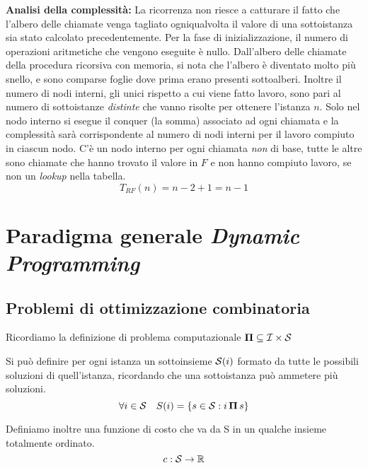 \textbf{Analisi della complessità:}
La ricorrenza non riesce a catturare il fatto che l'albero delle chiamate venga tagliato ogniqualvolta il valore di una sottoistanza sia stato calcolato precedentemente.
Per la fase di inizializzazione, il numero di operazioni aritmetiche che vengono eseguite è nullo.
Dall'albero delle chiamate della procedura ricorsiva con memoria, si nota che l'albero è diventato molto più snello, e sono comparse foglie dove prima erano presenti sottoalberi. Inoltre il numero di nodi interni, gli unici rispetto a cui viene fatto lavoro, sono pari al numero di sottoistanze \emph{distinte} che vanno risolte per ottenere l'istanza $n$. 
Solo nel nodo interno si esegue il conquer (la somma) associato ad ogni chiamata e la complessità sarà corrispondente al numero di nodi interni per il lavoro compiuto in ciascun nodo. C'è un nodo interno per ogni chiamata \emph{non} di base, tutte le altre sono chiamate che hanno trovato il valore in $F$ e non hanno compiuto lavoro, se non un \emph{lookup} nella tabella.
\begin{equation*}
    T_{RF} (n) = n-2+1 = n-1
\end{equation*}

\section{Paradigma generale \emph{Dynamic Programming}}

\subsection{Problemi di ottimizzazione combinatoria}

Ricordiamo la definizione di problema computazionale $\bm{\Pi}{} \subseteq \mathcal{I}{} \times \mathcal{S}{}$

Si può definire per ogni istanza un sottoinsieme $\mathcal{S}{}(i)$ formato da tutte le possibili soluzioni di quell'istanza, ricordando che una sottoistanza può ammetere più soluzioni.
\begin{equation*}
    \forall i \in \mathcal{S}{} \quad S(i) = \left\{ s \in \mathcal{S}{} : i \, \bm{\Pi}{} \, s \right\}
\end{equation*}

Definiamo inoltre una funzione di costo che va da S in un qualche insieme totalmente ordinato.
\begin{equation*}
    c : \mathcal{S}{} \to \mathbb{R}
\end{equation*}

